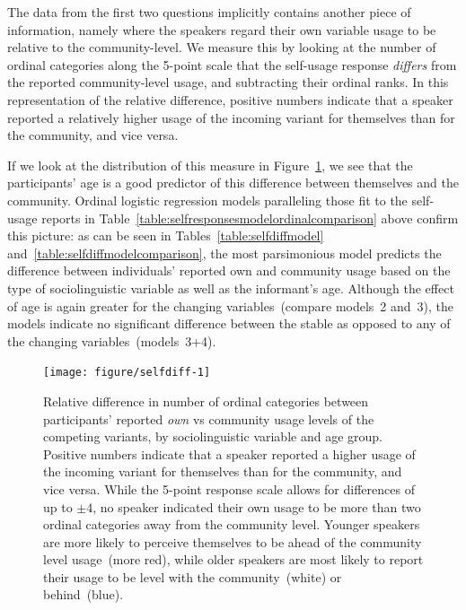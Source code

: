 The data from the first two questions implicitly contains another piece of information, namely where the speakers regard their own variable usage to be relative to the community-level. We measure this by looking at the number of ordinal categories along the 5-point scale that the self-usage response \emph{differs} from the reported community-level usage, and subtracting their ordinal ranks. In this representation of the relative difference, positive numbers indicate that a speaker reported a relatively higher usage of the incoming variant for themselves than for the community, and vice versa.

If we look at the distribution of this measure in Figure~\ref{fig:selfdiff}, we see that the participants' age is a good predictor of this difference between themselves and the community. %
Ordinal logistic regression models paralleling those fit to the self-usage reports in Table~\ref{table:selfresponsesmodelordinalcomparison} above confirm this picture: as can be seen in Tables~\ref{table:selfdiffmodel} and~\ref{table:selfdiffmodelcomparison}, the most parsimonious model predicts the difference between individuals' reported own and community usage based on the type of sociolinguistic variable as well as the informant's age. Although the effect of age is again greater for the changing variables~(compare models~2 and~3), the models indicate no significant difference between the stable as opposed to any of the changing variables~(models~3+4).

\begin{figure}[htbp]

{\centering \texttt{[image: figure/selfdiff-1]} 

}

\caption[Relative difference in number of ordinal categories between participants' reported \emph{own} vs community usage levels of the competing variants, by sociolinguistic variable and age group]{Relative difference in number of ordinal categories between participants' reported \emph{own} vs community usage levels of the competing variants, by sociolinguistic variable and age group. Positive numbers indicate that a speaker reported a higher usage of the incoming variant for themselves than for the community, and vice versa. While the 5-point response scale allows for differences of up to $\pm4$, no speaker indicated their own usage to be more than two ordinal categories away from the community level. Younger speakers are more likely to perceive themselves to be ahead of the community level usage~(more red), while older speakers are most likely to report their usage to be level with the community~(white) or behind~(blue).}\label{fig:selfdiff}
\end{figure}


